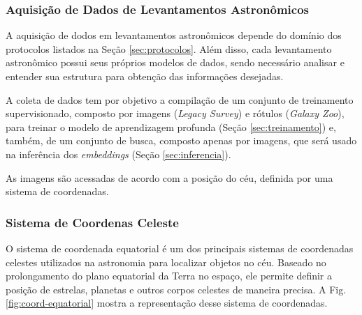\documentclass[a4,12pt]{horizon-theme}
\begin{document}


\subsubsection{Aquisição de Dados de Levantamentos Astronômicos}
A aquisição de dodos em levantamentos astronômicos depende do domínio dos  protocolos listados na Seção \ref{sec:protocolos}. Além disso, cada levantamento astronômico possui seus próprios modelos de dados, sendo necessário analisar e entender sua estrutura para obtenção das informações desejadas. %

A coleta de dados tem por objetivo a compilação de um conjunto de treinamento supervisionado, composto por imagens (\emph{Legacy Survey}) e rótulos (\emph{Galaxy Zoo}), para treinar o modelo de aprendizagem profunda (Seção \ref{sec:treinamento}) e, também, de um conjunto de busca, composto apenas por imagens, que será usado na inferência dos \emph{embeddings} (Seção \ref{sec:inferencia}).

As imagens são acessadas de acordo com a posição do céu, definida por uma sistema de coordenadas.

\subsubsection{Sistema de Coordenas Celeste}
\label{sec:coordenadas}
O sistema de coordenada equatorial é um dos principais sistemas de coordenadas celestes utilizados na astronomia para localizar objetos no céu. Baseado no prolongamento do plano equatorial da Terra no espaço, ele permite definir a posição de estrelas, planetas e outros corpos celestes de maneira precisa. A Fig. \ref{fig:coord-equatorial} mostra a representação desse sistema de coordenadas.
\end{document}
